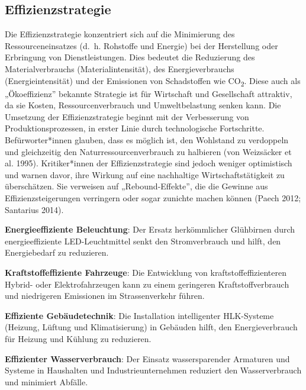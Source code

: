 \documentclass[
  nswissgerman,
  a4paper,
  DIV=11,
  numbers=noendperiod,
  oneside,
  openany]{scrreprt}
\begin{document}
\subsection{Effizienzstrategie}\label{effizienzstrategie}

Die Effizienzstrategie konzentriert sich auf die Minimierung des
Ressourceneinsatzes (d.~h. Rohstoffe und Energie) bei der Herstellung
oder Erbringung von Dienstleistungen. Dies bedeutet die Reduzierung des
Materialverbrauchs (Materialintensität), des Energieverbrauchs
(Energieintensität) und der Emissionen von Schadstoffen wie
CO\textsubscript{2}. Diese auch als „Ökoeffizienz'' bekannte Strategie
ist für Wirtschaft und Gesellschaft attraktiv, da sie Kosten,
Ressourcenverbrauch und Umweltbelastung senken kann. Die Umsetzung der
Effizienzstrategie beginnt mit der Verbesserung von
Produktionsprozessen, in erster Linie durch technologische Fortschritte.
Befürworter*innen glauben, dass es möglich ist, den Wohlstand zu
verdoppeln und gleichzeitig den Naturressourcenverbrauch zu halbieren
({von Weizsäcker et al.} 1995). Kritiker*innen der Effizienzstrategie
sind jedoch weniger optimistisch und warnen davor, ihre Wirkung auf eine
nachhaltige Wirtschaftstätigkeit zu überschätzen. Sie verweisen auf
„Rebound-Effekte'', die die Gewinne aus Effizienzsteigerungen verringern
oder sogar zunichte machen können (Paech 2012; Santarius 2014).

\begin{tcolorbox}[enhanced jigsaw, arc=.35mm, bottomrule=.15mm, bottomtitle=1mm, breakable, colback=white, colbacktitle=quarto-callout-tip-color!10!white, colframe=quarto-callout-tip-color-frame, coltitle=black, left=2mm, leftrule=.75mm, opacityback=0, opacitybacktitle=0.6, rightrule=.15mm, title={Effizienzstrategien in der Praxis: Beispiele}, titlerule=0mm, toprule=.15mm, toptitle=1mm]

\textbf{Energieeffiziente Beleuchtung}: Der Ersatz herkömmlicher
Glühbirnen durch energieeffiziente LED-Leuchtmittel senkt den
Stromverbrauch und hilft, den Energiebedarf zu reduzieren.

\textbf{Kraftstoffeffiziente Fahrzeuge}: Die Entwicklung von
kraftstoffeffizienteren Hybrid- oder Elektrofahrzeugen kann zu einem
geringeren Kraftstoffverbrauch und niedrigeren Emissionen im
Strassenverkehr führen.

\textbf{Effiziente Gebäudetechnik}: Die Installation intelligenter
HLK-Systeme (Heizung, Lüftung und Klimatisierung) in Gebäuden hilft, den
Energieverbrauch für Heizung und Kühlung zu reduzieren.

\textbf{Effizienter Wasserverbrauch}: Der Einsatz wassersparender
Armaturen und Systeme in Haushalten und Industrieunternehmen reduziert
den Wasserverbrauch und minimiert Abfälle.

\end{tcolorbox}
\end{document}
